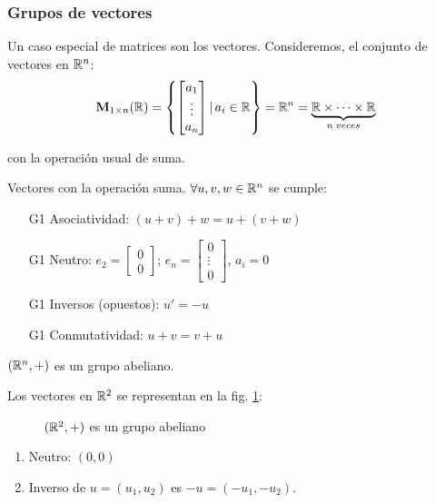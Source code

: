 \subsubsection{Grupos de vectores}

Un caso especial de matrices son los vectores. Consideremos, el conjunto de vectores en $\mathbb{R}^n$:
\begin{equation}
	\mathbf{M}_{1 \times n}(\mathbb{R}) = \left\{ \begin{bmatrix}
		a_1 \\ \vdots \\ a_n \end{bmatrix} | \, a_{i} \in \mathbb{R} \right\}
	\label{eq:vectores} = \mathbb{R}^n = \underbrace{\mathbb{R} \times \cdots \times \mathbb{R}}_{n \; veces}
\end{equation}

con la operación usual de suma.

Vectores con la operación suma. $\forall u, v, w \in \mathbb{R}^n$ se cumple:
\begin{itemize}
	\item[G1] Asociatividad: $(u + v) + w = u + (v + w)$ \quad \cmark 
	\item[G1] Neutro: $e_2 = \begin{bmatrix} 0 \\ 0 \end{bmatrix}$; $e_n = \begin{bmatrix} 0 \\ \vdots \\ 0 \end{bmatrix}$, $a_i = 0$ \quad \cmark 
	\item[G1] Inversos (opuestos): $u' = -u$ \quad \cmark 
	\item[G1] Conmutatividad: $u + v = v + u$ \quad \cmark 
\end{itemize}

\begin{center}
	$(\mathbb{R}^n, +)$ es un grupo abeliano.
\end{center}

Los vectores en $\mathbb{R}^2$ se representan en la fig. \ref{fig:grupoR2}:

\begin{figure}[h]
	\centering
	
	\caption{$(\mathbb{R}^2, +)$ es un grupo abeliano}
	\label{fig:grupoR2}
\end{figure}

\begin{enumerate}[label=\roman*)]
	\item Neutro: $(0,0)$
	\item Inverso de $u = (u_1, u_2)$ es $-u = (-u_1, -u_2)$.
\end{enumerate}

